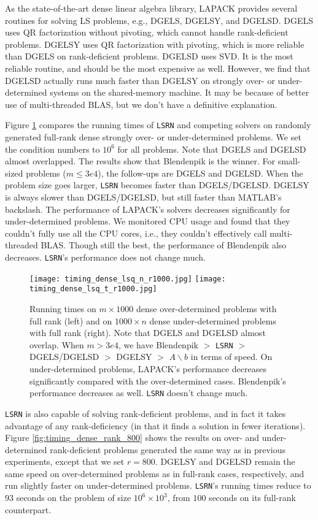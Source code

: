 \documentclass{siamltex}
\begin{document}
As the state-of-the-art dense linear algebra library, LAPACK provides several
routines for solving LS problems, e.g., DGELS, DGELSY, and
DGELSD. DGELS uses QR factorization without pivoting, which cannot handle
rank-deficient problems. DGELSY uses QR factorization with pivoting, which is
more reliable than DGELS on rank-deficient problems. DGELSD uses SVD. It is the
most reliable routine, and should be the most expensive as well. However, we
find that DGELSD actually runs much faster than DGELSY on strongly over- or
under-determined systems on the shared-memory machine. It may be because of
better use of multi-threaded BLAS, but we don't have a definitive explanation.

Figure \ref{fig:timing_dense_full_rank} compares the running times of
\texttt{LSRN} and competing solvers on randomly generated full-rank dense
strongly over- or under-determined problems. We set the condition numbers to
$10^6$ for all problems. Note that DGELS and DGELSD almost overlapped. The
results show that Blendenpik is the winner. For small-sized problems ($m \leq
3e4$), the follow-ups are DGELS and DGELSD. When the problem size goes larger,
\texttt{LSRN} becomes faster than DGELS/DGELSD. DGELSY is always slower than
DGELS/DGELSD, but still faster than MATLAB's backslash. The performance of
LAPACK's solvers decreases significantly for under-determined problems. We
monitored CPU usage and found that they couldn't fully use all the CPU cores,
i.e., they couldn't effectively call multi-threaded BLAS. Though still the best,
the performance of Blendenpik also decreases. \texttt{LSRN}'s performance does
not change much.

\begin{figure}
  \centering
  \texttt{[image: timing\_dense\_lsq\_n\_r1000.jpg]}
  \texttt{[image: timing\_dense\_lsq\_t\_r1000.jpg]}
  \caption{Running times on $m \times 1000$ dense over-determined problems with
    full rank (left) and on $1000 \times n$ dense under-determined problems with
    full rank (right).  Note that DGELS and DGELSD almost overlap. When $m >
    3e4$, we have Blendenpik $>$ \texttt{LSRN} $>$ DGELS/DGELSD $>$ DGELSY $>$
    $A\backslash b$ in terms of speed. On under-determined problems, LAPACK's
    performance decreases significantly compared with the over-determined
    cases. Blendenpik's performance decreases as well. \texttt{LSRN} doesn't
    change much.}
  \label{fig:timing_dense_full_rank}
\end{figure}

\texttt{LSRN} is also capable of solving rank-deficient problems, and in fact it
takes advantage of any rank-deficiency (in that it finds a solution in fewer
iterations).  Figure \ref{fig:timing_dense_rank_800} shows the results on over-
and under-determined rank-deficient problems generated the same way as in
previous experiments, except that we set $r = 800$. DGELSY and DGELSD remain the
same speed on over-determined problems as in full-rank cases, respectively, and
run slightly faster on under-determined problems. \texttt{LSRN}'s running times
reduce to $93$ seconds on the problem of size $10^6 \times 10^3$, from $100$
seconds on its full-rank counterpart.
\end{document}
